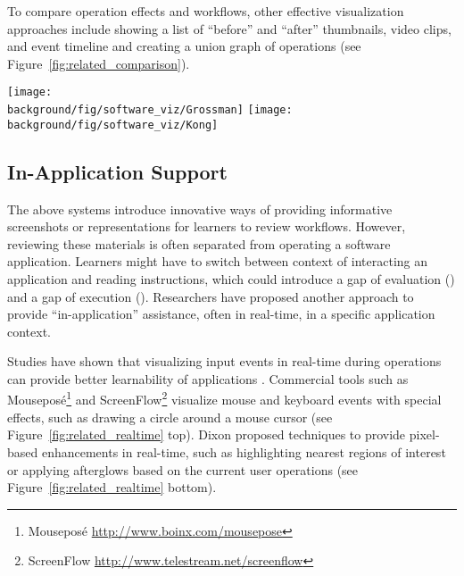 To compare operation effects and workflows, other effective visualization approaches include showing a list of ``before'' and ``after'' thumbnails, video clips, and event timeline \cite{Grossman:2010jz} and creating a union graph of operations \cite{Kong:2012:DTR:2207676.2208549} (see Figure~\ref{fig:related_comparison}).

\begin{figure*}[t!]
  \centering
  \texttt{[image: \\background/fig/software\_viz/Grossman]}
  \texttt{[image: \\background/fig/software\_viz/Kong]}
  \caption{Instructional systems that help learners compare effects and similar tutorials using: (left) before and after images (a) and event timeline (b) by Grossman \ea{}~\cite{Grossman:2010jz} and (right) operation union graph by Kong \ea{}~\cite{Kong:2012:DTR:2207676.2208549}.}
  \label{fig:related_comparison}
\end{figure*}


\subsection{In-Application Support}

The above systems introduce innovative ways of providing informative screenshots or representations for learners to review workflows. However, reviewing these materials is often separated from operating a software application. Learners might have to switch between context of interacting an application and reading instructions, which could introduce a gap of evaluation () and a gap of execution ().
%
Researchers have proposed another approach to provide ``in-application'' assistance, often in real-time, in a specific application context.

Studies have shown that visualizing input events in real-time during operations can provide better learnability of applications \cite{Dixon:2010fb}.
%
Commercial tools such as Mouseposé\footnote{Mouseposé \url{http://www.boinx.com/mousepose}} and ScreenFlow\footnote{ScreenFlow \url{http://www.telestream.net/screenflow}} visualize mouse and keyboard events with special effects, such as drawing a circle around a mouse cursor (see Figure~\ref{fig:related_realtime} top).
%
Dixon \ea{} proposed techniques to provide pixel-based enhancements in real-time, such as highlighting nearest regions of interest or applying afterglows based on the current user operations \cite{Dixon:2010fb,Dixon:2011:CHP:1978942.1979086} (see Figure~\ref{fig:related_realtime} bottom).

